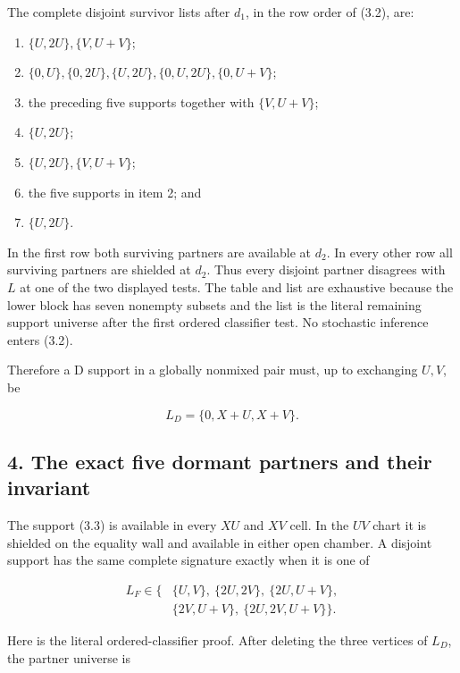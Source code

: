 The complete disjoint survivor lists after \(d_1\), in the row order of
(3.2), are:

\begin{enumerate}
\def\labelenumi{\arabic{enumi}.}
\tightlist
\item
  \(\{U,2U\},\{V,U+V\}\);
\item
  \(\{0,U\},\{0,2U\},\{U,2U\},\{0,U,2U\},\{0,U+V\}\);
\item
  the preceding five supports together with \(\{V,U+V\}\);
\item
  \(\{U,2U\}\);
\item
  \(\{U,2U\},\{V,U+V\}\);
\item
  the five supports in item 2; and
\item
  \(\{U,2U\}\).
\end{enumerate}

In the first row both surviving partners are available at \(d_2\). In
every other row all surviving partners are shielded at \(d_2\). Thus
every disjoint partner disagrees with \(L\) at one of the two displayed
tests. The table and list are exhaustive because the lower block has
seven nonempty subsets and the list is the literal remaining support
universe after the first ordered classifier test. No stochastic
inference enters (3.2).

Therefore a D support in a globally nonmixed pair must, up to exchanging
\(U,V\), be

\[
                         L_D=\{0,X+U,X+V\}.             \tag{3.3}
\]

\subsection{4. The exact five dormant partners and their
invariant}

The support (3.3) is available in every \(XU\) and \(XV\) cell. In the
\(UV\) chart it is shielded on the equality wall and available in either
open chamber. A disjoint support has the same complete signature exactly
when it is one of

\[
\begin{aligned}
 L_F\in\{&\{U,V\},\ \{2U,2V\},\ \{2U,U+V\},\\
          &\{2V,U+V\},\ \{2U,2V,U+V\}\}.
\end{aligned}                                          \tag{4.1}
\]

Here is the literal ordered-classifier proof. After deleting the three
vertices of \(L_D\), the partner universe is

